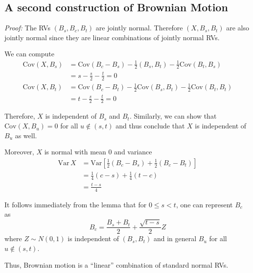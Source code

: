 \documentclass[12pt]{report}
\newcommand{\Cov}{\text{Cov}}
\newcommand{\Var}{\text{Var}}
\newenvironment*{tbox}[2][gray]{
    \begin{tcolorbox}[
        parbox=false,
        colback=#1!5!white,
        colframe=#1!75!black,
        breakable,
        title={#2}
    ]}
    {\end{tcolorbox}}
\begin{document}
\subsection{A second construction of Brownian Motion}
    \begin{tbox}{\textbf{Lemma:} Let $\{B_t: t \geq 0\}$ be a standard Brownian motion. For any $0 \leq s < t$ and  $c = (s + t)/2$,
    \[X = B_c - \frac{1}{2} (B_s + B_t) \sim N(0, \frac{t-S}{4})\]
    is independent of $(B_s, B_t)$. Indeed, $X$ is independent of $B_u$ for any $u \notin (s, t)$}
        \emph{Proof:} The RVs $(B_s, B_c, B_t)$ are jointly normal. Therefore $(X, B_s, B_t)$ are also jointly normal since they are linear combinations of jointly normal RVs. 

        We can compute 
        \begin{align*}
            \Cov(X, B_s) &= \Cov(B_c - B_s) - \frac{1}{2}(B_s, B_t) -\frac{1}{2}\Cov(B_t, B_s)\\ 
                &= s - \frac{s}{2} - \frac{t}{2} = 0\\ 
            \Cov(X, B_t) &= \Cov(B_c - B_t) - \frac{1}{2}\Cov(B_s, B_t) - \frac{1}{2}\Cov(B_t, B_t)\\
                &= t - \frac{s}{2} - \frac{t}{2} = 0
        \end{align*}

        Therefore, $X$ is independent of $B_s$ and $B_t$. Similarly, we can show that $\Cov(X, B_u) = 0$ for all $u \notin (s, t)$ and thus conclude that $X$ is independent of $B_u$ as well. 

        Moreover, $X$ is normal with mean $0$ and variance 
        \begin{align*}
            \Var\, X &= \Var\left[\frac{1}{2}(B_c - B_s) + \frac{1}{2}(B_c - B_t)\right]\\ 
                &= \frac{1}{4} (c - s) + \frac{1}{4}(t - c)\\ 
                &= \frac{t - s}{4}
        \end{align*}
    \end{tbox}

    It follows immediately from the lemma that for $0 \leq s < t$, one can represent $B_c$ as 
    \[B_c = \frac{B_s + B_t}{2} + \frac{\sqrt{t - s}}{2}Z\]
    where $Z \sim N(0, 1)$ is independent of $(B_s, B_t)$ and in general $B_u$ for all $u \notin (s, t)$. 

    Thus, Brownian motion is a ``linear'' combination of standard normal RVs. 
\end{document}
